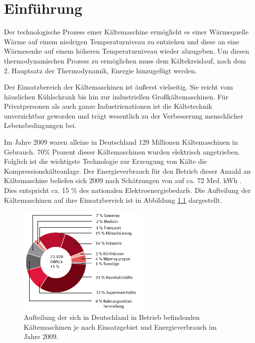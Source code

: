 \chapter{Einführung}
\label{cha:Einfuehrung}

Der technologische Prozess einer Kältemaschine ermöglicht es einer Wärmequelle Wärme  auf einem niedrigen Temperaturniveau zu entziehen und diese an eine Wärmesenke auf einem höheren Temperaturniveau wieder abzugeben. Um diesen thermodynamischen Prozess zu ermöglichen muss dem  Kältekreislauf, nach dem 2. Hauptsatz der Thermodynamik, Energie hinzugefügt werden. 

Der Einsatzbereich der Kältemaschinen ist äußerst vielseitig. Sie reicht vom häuslichen Kühlschrank bis hin zur industriellen Großkältemaschinen. Für Privatpersonen als auch ganze Industrienationen ist die Kältetechnik unverzichtbar geworden und trägt wesentlich zu der Verbesserung menschlicher Lebensbedingungen bei. 

Im Jahre 2009 waren alleine in Deutschland 129 Millionen Kältemaschinen in Gebrauch. 70$\%$ Prozent dieser Kältemaschinen wurden elektrisch angetrieben. Folglich ist die wichtigste Technologie zur Erzeugung von Kälte die Kompressionskälteanlage. Der Energieverbrauch für den Betrieb dieser Anzahl an Kältemaschine beliefen sich 2009 nach Schätzungen von \citeauthor{Preuss2011} auf  ca. 72 Mrd. kWh . Dies entspricht ca. 15 $\%$ des nationalen Elektroenergiebedarfs. Die Aufteilung der Kältemaschinen auf ihre Einsatzbereich ist in Abbildung \ref{fig:Aufteilung nach Einsatzgebiet} dargestellt. 

\begin{figure}[htb]
	\centering
		\includegraphics[width=0.570\textwidth]{Pictures/Energieverbrauch_Aufteilung_Karlsruhe.png}
	\caption{Aufteilung der sich in Deutschland in Betrieb befindenden Kältemaschinen je nach Einsatzgebiet und Energieverbrauch im Jahre 2009. \citep{M.Stoeckner2012}}
	\label{fig:Aufteilung nach Einsatzgebiet}
\end{figure}


